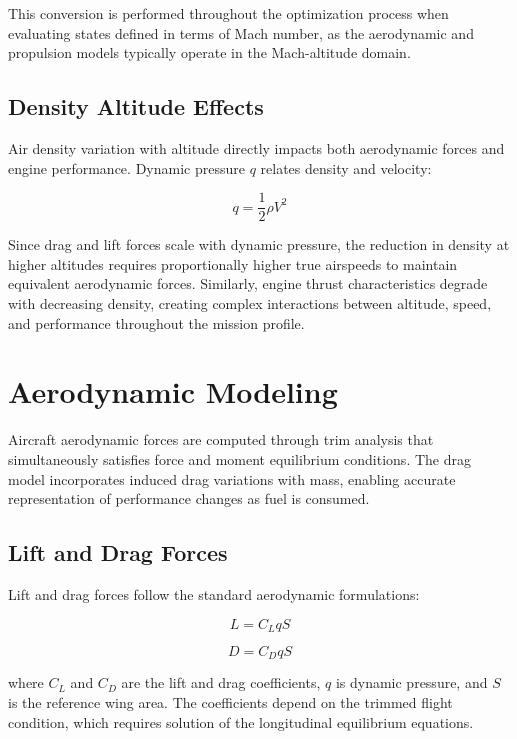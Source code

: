 This conversion is performed throughout the optimization process when evaluating states defined in terms of Mach number, as the aerodynamic and propulsion models typically operate in the Mach-altitude domain.

\subsection{Density Altitude Effects}

Air density variation with altitude directly impacts both aerodynamic forces and engine performance. Dynamic pressure $q$ relates density and velocity:

\begin{equation}
q = \frac{1}{2}\rho V^2
\end{equation}

Since drag and lift forces scale with dynamic pressure, the reduction in density at higher altitudes requires proportionally higher true airspeeds to maintain equivalent aerodynamic forces. Similarly, engine thrust characteristics degrade with decreasing density, creating complex interactions between altitude, speed, and performance throughout the mission profile.

\section{Aerodynamic Modeling}

Aircraft aerodynamic forces are computed through trim analysis that simultaneously satisfies force and moment equilibrium conditions. The drag model incorporates induced drag variations with mass, enabling accurate representation of performance changes as fuel is consumed.

\subsection{Lift and Drag Forces}

Lift and drag forces follow the standard aerodynamic formulations:

\begin{equation}
L = C_L q S
\end{equation}

\begin{equation}
D = C_D q S
\end{equation}

where $C_L$ and $C_D$ are the lift and drag coefficients, $q$ is dynamic pressure, and $S$ is the reference wing area. The coefficients depend on the trimmed flight condition, which requires solution of the longitudinal equilibrium equations.

